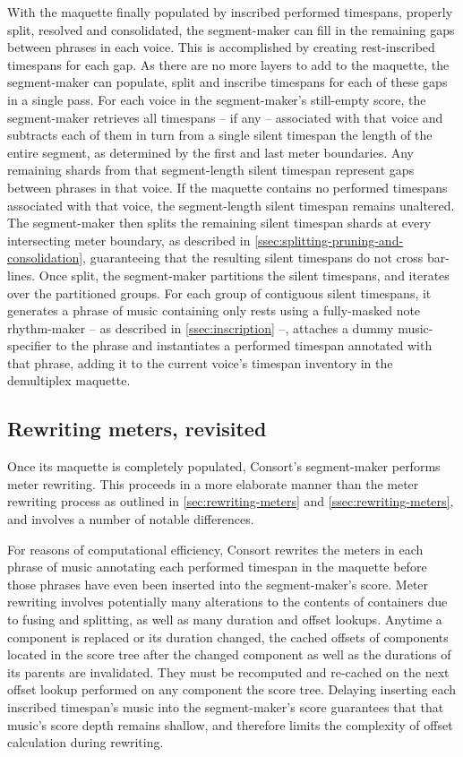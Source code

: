 With the maquette finally populated by inscribed performed timespans, properly
split, resolved and consolidated, the segment-maker can fill in the remaining
gaps between phrases in each voice. This is accomplished by creating
rest-inscribed timespans for each gap. As there are no more layers to add to
the maquette, the segment-maker can populate, split and inscribe timespans for
each of these gaps in a single pass. For each voice in the segment-maker's
still-empty score, the segment-maker retrieves all timespans -- if any --
associated with that voice and subtracts each of them in turn from a single
silent timespan the length of the entire segment, as determined by the first
and last meter boundaries. Any remaining shards from that segment-length silent
timespan represent gaps between phrases in that voice. If the maquette contains
no performed timespans associated with that voice, the segment-length silent
timespan remains unaltered. The segment-maker then splits the remaining silent
timespan shards at every intersecting meter boundary, as described in
\autoref{ssec:splitting-pruning-and-consolidation}, guaranteeing that the
resulting silent timespans do not cross bar-lines. Once split, the
segment-maker partitions the silent timespans, and iterates over the
partitioned groups. For each group of contiguous silent timespans, it generates
a phrase of music containing only rests using a fully-masked note rhythm-maker
-- as described in \autoref{ssec:inscription} --, attaches a dummy
music-specifier to the phrase and instantiates a performed timespan annotated
with that phrase, adding it to the current voice's timespan inventory in the
demultiplex maquette.

\subsection{Rewriting meters, revisited}
\label{ssec:rewriting-meters-revisited}

Once its maquette is completely populated, Consort's segment-maker performs
meter rewriting. This proceeds in a more elaborate manner than the meter
rewriting process as outlined in \autoref{sec:rewriting-meters} and
\autoref{ssec:rewriting-meters}, and involves a number of notable differences.

For reasons of computational efficiency, Consort rewrites the meters in
each phrase of music annotating each performed timespan in the maquette before
those phrases have even been inserted into the segment-maker's score. Meter
rewriting involves potentially many alterations to the contents of containers
due to fusing and splitting, as well as many duration and offset lookups.
Anytime a component is replaced or its duration changed, the cached offsets of
components located in the score tree after the changed component as well as
the durations of its parents are invalidated. They must be recomputed and
re-cached on the next offset lookup performed on any component the score tree.
Delaying inserting each inscribed timespan's music into the segment-maker's
score guarantees that that music's score depth remains shallow, and therefore
limits the complexity of offset calculation during rewriting.

